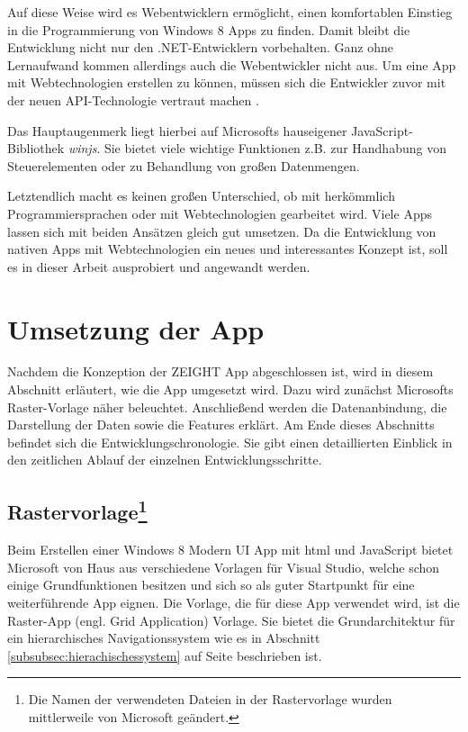 \documentclass[12pt,a4paper,bibtotoc,abstracton]{scrartcl}
\begin{document}
Auf diese Weise wird es Webentwicklern ermöglicht, einen komfortablen Einstieg in die Programmierung von Windows 8 Apps zu finden. Damit bleibt die Entwicklung nicht nur den .NET-Entwicklern vorbehalten. Ganz ohne Lernaufwand kommen allerdings auch die Webentwickler nicht aus. Um eine App mit Webtechnologien erstellen zu können, müssen sich die Entwickler zuvor mit der neuen API-Technologie vertraut machen \citep{Bleske2012}.

Das Hauptaugenmerk liegt hierbei auf Microsofts hauseigener JavaScript-Bibliothek \textit{\ac{winjs}}. Sie bietet viele wichtige Funktionen z.B. zur Handhabung von Steuerelementen oder zu Behandlung von großen Datenmengen. 

Letztendlich macht es keinen großen Unterschied, ob mit herkömmlich Programmiersprachen oder mit Webtechnologien gearbeitet wird. Viele Apps lassen sich mit beiden Ansätzen gleich gut umsetzen. Da die Entwicklung von nativen Apps mit Webtechnologien ein neues und interessantes Konzept ist, soll es in dieser Arbeit ausprobiert und angewandt werden.

\newpage
\section{Umsetzung der App}
\label{sec:umsetzungderapp}
Nachdem die Konzeption der ZEIGHT App abgeschlossen ist, wird in diesem Abschnitt erläutert, wie die App umgesetzt wird. Dazu wird zunächst Microsofts Raster-Vorlage näher beleuchtet. Anschließend werden die Datenanbindung, die Darstellung der Daten sowie die Features erklärt. Am Ende dieses Abschnitts befindet sich die Entwicklungschronologie. Sie gibt einen detaillierten Einblick in den zeitlichen Ablauf der einzelnen Entwicklungsschritte.

\subsection[Rastervorlage] {Rastervorlage\footnote{Die Namen der verwendeten Dateien in der Rastervorlage wurden mittlerweile von Microsoft geändert.}}
\label{subsec:rastervorlage}
Beim Erstellen einer Windows 8 Modern UI App mit \ac{html} und JavaScript bietet Microsoft von Haus aus verschiedene Vorlagen für Visual Studio, welche schon einige Grundfunktionen besitzen und sich so als guter Startpunkt für eine weiterführende App eignen. Die Vorlage, die für diese App verwendet wird, ist die Raster-App (engl. Grid Application) Vorlage. Sie bietet die Grundarchitektur für ein hierarchisches Navigationssystem wie es in Abschnitt \ref{subsubsec:hierachischessystem} auf Seite \pageref{subsubsec:hierachischessystem} beschrieben ist.
\end{document}
